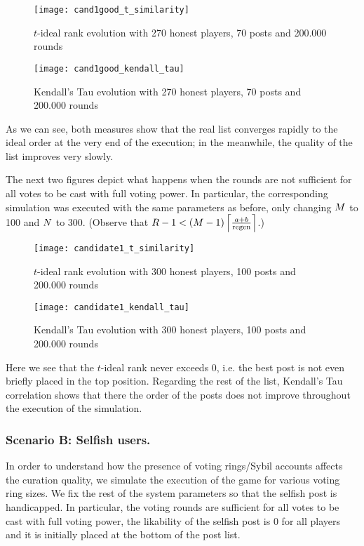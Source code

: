       \begin{figure}[!htbp]
        \texttt{[image: cand1good\_t\_similarity]}
        \caption{$t$-ideal rank evolution with 270 honest players, 70 posts and
        200.000 rounds}
      \end{figure}

      \begin{figure}[!htbp]
        \texttt{[image: cand1good\_kendall\_tau]}
        \caption{Kendall's Tau evolution with 270 honest players, 70 posts and
        200.000 rounds}
      \end{figure}

      As we can see, both measures show that the real list converges rapidly to
      the ideal order at the very end of the execution; in the meanwhile, the
      quality of the list improves very slowly.

      The next two figures depict what happens when the rounds are not
      sufficient for all votes to be cast with full voting power. In particular,
      the corresponding simulation was executed with the same parameters as
      before, only changing $\postlen$ to 100 and $\playerlen$ to 300. (Observe
      that $\rounds - 1 < \left(\postlen - 1\right)\ceil*{\frac{a +
      b}{\regen}}$.)

      \begin{figure}[!htbp]
        \texttt{[image: candidate1\_t\_similarity]}
        \caption{$t$-ideal rank evolution with 300 honest players, 100 posts and
        200.000 rounds}
      \end{figure}

      \begin{figure}[!htbp]
        \texttt{[image: candidate1\_kendall\_tau]}
        \caption{Kendall's Tau evolution with 300 honest players, 100 posts and
        200.000 rounds}
      \end{figure}

      Here we see that the $t$-ideal rank never exceeds 0, i.e. the best post is
      not even briefly placed in the top position. Regarding the rest of the
      list, Kendall's Tau correlation shows that there the order of the posts
      does not improve throughout the execution of the simulation.

    \subsubsection{Scenario B: Selfish users.}
      In order to understand how the presence of voting rings/Sybil accounts
      affects the curation quality, we simulate the execution of the game for
      various voting ring sizes. We fix the rest of the system parameters so
      that the selfish post is handicapped. In particular, the voting rounds are
      sufficient for all votes to be cast with full voting power, the likability
      of the selfish post is 0 for all players and it is initially placed at the
      bottom of the post list.

